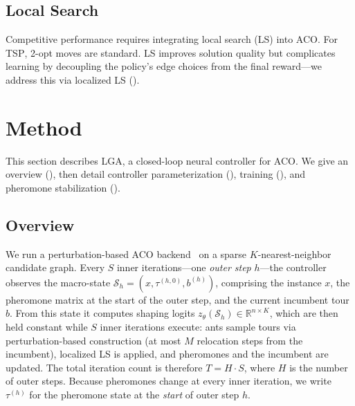 \documentclass[sigconf,anonymous,review]{acmart}
\theoremstyle{definition}
\theoremstyle{plain}
\newcommand{\R}{\mathbb{R}}
\newcommand{\TSP}{\textsc{TSP}}
\newcommand{\LGA}{\textsc{LGA}}
\begin{document}
\subsection{Local Search}
Competitive performance requires integrating local search (LS) into ACO.
For \TSP{}, 2-opt moves are standard.
LS improves solution quality but complicates learning by decoupling the policy's edge choices from the final reward---we address this via localized LS ().

\section{Method}
\label{sec:method}

This section describes \LGA{}, a closed-loop neural controller for ACO.
We give an overview (), then detail controller parameterization (), training (), and pheromone stabilization ().

\subsection{Overview}
\label{sec:overview}

We run a perturbation-based ACO backend~\cite{faco} on a sparse $K$-nearest-neighbor candidate graph.
Every $S$ inner iterations---one \emph{outer step} $h$---the controller observes the macro-state $\mathcal{S}_h = (x, \tau^{(h,0)}, b^{(h)})$, comprising the instance $x$, the pheromone matrix at the start of the outer step, and the current incumbent tour $b$.
From this state it computes shaping logits $z_\theta(\mathcal{S}_h) \in \R^{n \times K}$, which are then held constant while $S$ inner iterations execute: ants sample tours via perturbation-based construction (at most $M$ relocation steps from the incumbent), localized LS is applied, and pheromones and the incumbent are updated.
The total iteration count is therefore $T = H \cdot S$, where $H$ is the number of outer steps.
Because pheromones change at every inner iteration, we write $\tau^{(h)}$ for the pheromone state at the \emph{start} of outer step $h$.
\end{document}
